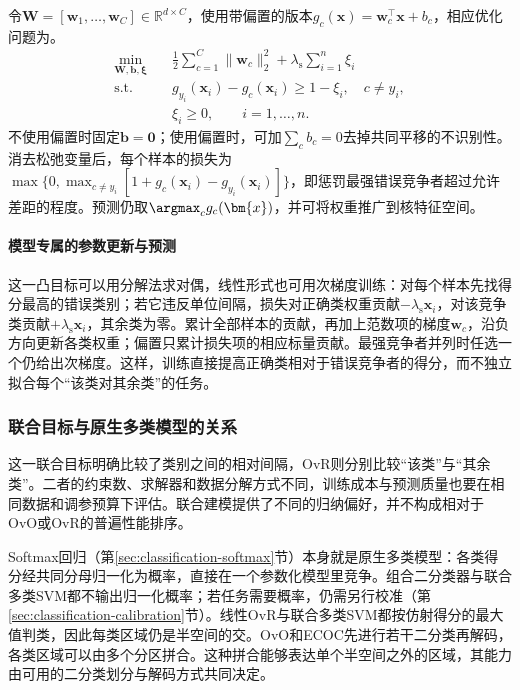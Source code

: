 令$\bm{W}=[\bm{w}_1,\ldots,\bm{w}_C]\in\mathbb{R}^{d\times C}$，使用带偏置的版本$g_c(\bm{x})=\bm{w}_c^{\top}\bm{x}+b_c$，相应优化问题为。
\begin{equation}
  \begin{aligned}
    \min_{\bm{W},\bm{b},\bm{\xi}}\quad&
      \frac12\sum_{c=1}^C\lVert\bm{w}_c\rVert_2^2
       +\lambda_{\mathrm{s}}\sum_{i=1}^n\xi_i\\
    \text{s.t.}\quad&
      g_{y_i}(\bm{x}_i)-g_c(\bm{x}_i)\ge1-\xi_i,
      \quad c\ne y_i,\\
    &\xi_i\ge0,\qquad i=1,\ldots,n.
  \end{aligned}
  \label{eq:classification-svm-crammer-singer}
\end{equation}
不使用偏置时固定$\bm{b}=\bm{0}$；使用偏置时，可加$\sum_c b_c=0$去掉共同平移的不识别性。消去松弛变量后，每个样本的损失为$\max\{0,\max_{c\ne y_i}[1+g_c(\bm{x}_i)-g_{y_i}(\bm{x}_i)]\}$，即惩罚最强错误竞争者超过允许差距的程度。预测仍取$\argmax_c g_c(\bm{x})$，并可将权重推广到核特征空间。

\paragraph{模型专属的参数更新与预测}
这一凸目标可以用分解法求对偶，线性形式也可用次梯度训练：对每个样本先找得分最高的错误类别；若它违反单位间隔，损失对正确类权重贡献$-\lambda_{\mathrm s}\bm x_i$，对该竞争类贡献$+\lambda_{\mathrm s}\bm x_i$，其余类为零。累计全部样本的贡献，再加上范数项的梯度$\bm w_c$，沿负方向更新各类权重；偏置只累计损失项的相应标量贡献。最强竞争者并列时任选一个仍给出次梯度。这样，训练直接提高正确类相对于错误竞争者的得分，而不独立拟合每个“该类对其余类”的任务。

\subsubsection{联合目标与原生多类模型的关系}
这一联合目标明确比较了类别之间的相对间隔，OvR则分别比较“该类”与“其余类”。二者的约束数、求解器和数据分解方式不同，训练成本与预测质量也要在相同数据和调参预算下评估。联合建模提供了不同的归纳偏好，并不构成相对于OvO或OvR的普遍性能排序。

Softmax回归（第\ref{sec:classification-softmax}节）本身就是原生多类模型：各类得分经共同分母归一化为概率，直接在一个参数化模型里竞争。组合二分类器与联合多类SVM都不输出归一化概率；若任务需要概率，仍需另行校准（第\ref{sec:classification-calibration}节）。线性OvR与联合多类SVM都按仿射得分的最大值判类，因此每类区域仍是半空间的交。OvO和ECOC先进行若干二分类再解码，各类区域可以由多个分区拼合。这种拼合能够表达单个半空间之外的区域，其能力由可用的二分类划分与解码方式共同决定。

